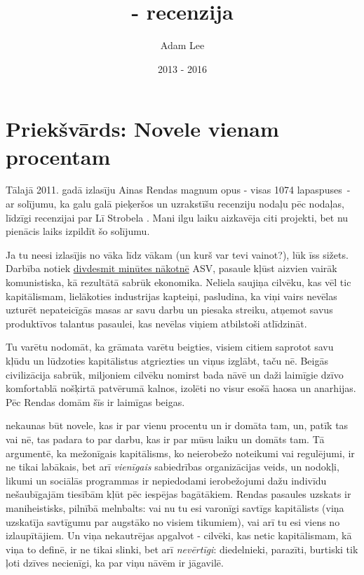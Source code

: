 \documentclass[12pt]{article}
\title{\say{Atlas Shrugged} - recenzija}
\author{Adam Lee}
\date{2013 - 2016}
\begin{document}
\maketitle

\tableofcontents

\section{Priekšvārds: Novele vienam procentam}
\label{sec:foreword}

Tālajā 2011. gadā izlasīju Ainas Rendas magnum opus  - visas 1074 lapaspuses~- ar solījumu, ka galu galā pieķeršos un uzrakstīšu recenziju nodaļu pēc nodaļas, līdzīgi recenzijai par Lī Strobela \href{https://web.archive.org/web/20160313005416/http://www.patheos.com/blogs/daylightatheism/series/the-case-for-a-creator}{}. Mani ilgu laiku aizkavēja citi projekti, bet nu pienācis laiks izpildīt šo solījumu.

Ja tu neesi izlasījis  no vāka līdz vākam (un kurš var tevi vainot?), lūk īss sižets. Darbība notiek \href{https://tvtropes.org/pmwiki/pmwiki.php/Main/TwentyMinutesIntoTheFuture}{divdesmit minūtes nākotnē} ASV, pasaule kļūst aizvien vairāk komunistiska, kā rezultātā sabrūk ekonomika. Neliela saujiņa cilvēku, kas vēl tic kapitālismam, lielākoties industrijas kapteiņi, pasludina, ka viņi vairs nevēlas uzturēt nepateicīgās masas ar savu darbu un piesaka streiku, atņemot savus produktīvos talantus pasaulei, kas nevēlas viņiem atbilstoši atlīdzināt.

Tu varētu nodomāt, ka grāmata varētu beigties, visiem citiem saprotot savu kļūdu un lūdzoties kapitālistus atgriezties un viņus izglābt, taču nē. Beigās civilizācija sabrūk, miljoniem cilvēku nomirst bada nāvē un daži laimīgie dzīvo komfortablā nošķirtā patvērumā kalnos, izolēti no visur esošā haosa un anarhijas. Pēc Rendas domām šīs ir laimīgas beigas.

 nekaunas būt novele, kas ir par vienu procentu un ir domāta tam, un, patīk tas vai nē, tas padara to par darbu, kas ir par mūsu laiku un domāts tam. Tā argumentē, ka mežonīgais kapitālisms, ko neierobežo noteikumi vai regulējumi, ir ne tikai labākais, bet arī \textit{vienīgais} sabiedrības organizācijas veids, un nodokļi, likumi un sociālās programmas ir nepiedodami ierobežojumi dažu indivīdu nešaubīgajām tiesībām kļūt pēc iespējas bagātākiem. Rendas pasaules uzskats ir maniheistisks, pilnībā melnbalts: vai nu tu esi varonīgi savtīgs kapitālists (viņa uzskatīja savtīgumu par augstāko no visiem tikumiem), vai arī tu esi viens no izlaupītājiem. Un viņa nekautrējas apgalvot - cilvēki, kas netic kapitālismam, kā viņa to definē, ir ne tikai slinki, bet arī \textit{nevērtīgi}: diedelnieki, parazīti, burtiski tik ļoti dzīves necienīgi, ka par viņu nāvēm ir jāgavilē.
\end{document}
